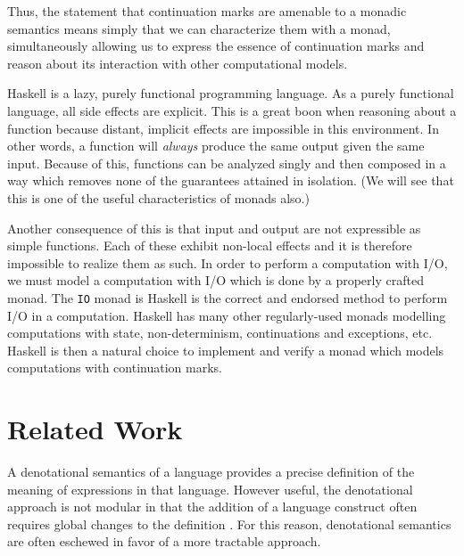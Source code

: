 \documentclass[ms]{byuprop}
\begin{document}


Thus, the statement that continuation marks are amenable to a monadic semantics means simply that we can characterize them with a monad, simultaneously allowing us to express the essence of continuation marks and reason about its interaction with other computational models.

Haskell \cite{hudak1992report} is a lazy, purely functional programming language. As a purely functional language, all side effects are explicit. This is a great boon when reasoning about a function because distant, implicit effects are impossible in this environment. In 
other words, a function will \emph{always} produce the same output given the same input.
Because of this, functions can be analyzed singly and then composed in a way which removes none of the guarantees attained in isolation. (We will see that this is one of the useful characteristics of monads also.)

Another consequence of this is that input and output are not expressible as simple functions. Each of these exhibit non-local effects and it is therefore impossible to realize them as such. In order to perform a computation with I/O, we must model a computation with I/O which is done by a properly crafted monad. The \texttt{IO} monad is Haskell is the correct and endorsed method to perform I/O in a computation. Haskell has many other regularly-used monads modelling computations with state, non-determinism, continuations and exceptions, etc. Haskell is then a natural choice to implement and verify a monad which models computations with continuation marks.

\section{Related Work}

A denotational semantics of a language provides a precise definition of the meaning of expressions in that language. However useful, the denotational approach is not modular in that the addition of a language construct often requires global changes to the definition \cite{liang2009modular}. For this reason, denotational semantics are often eschewed in favor of a more tractable approach.
\end{document}
